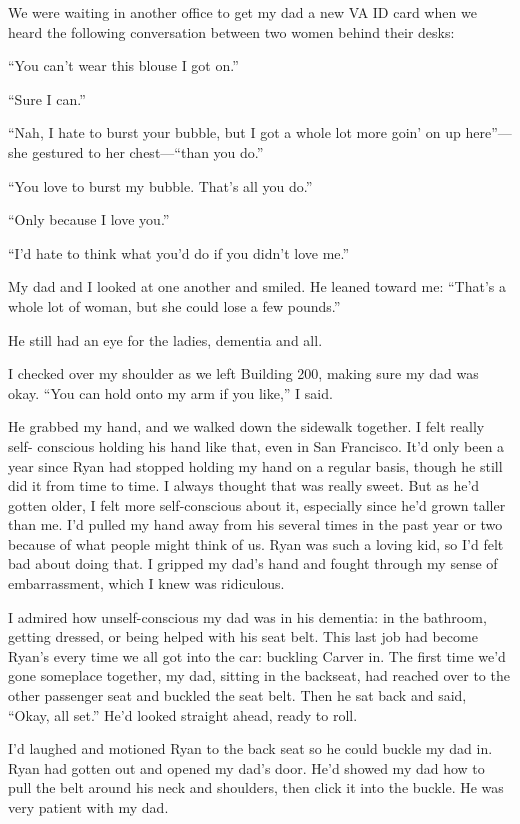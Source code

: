 \documentclass[12pt]{book}
\begin{document}
We were waiting in another office to get my dad a new VA ID card when we heard the following conversation between two women behind their desks:

``You can't wear this blouse I got on.'' 

``Sure I can.''

``Nah, I hate to burst your bubble, but I got a whole lot more goin' on up here''---she gestured to her chest---``than you do.''

``You love to burst my bubble. That's all you do.''

``Only because I love you.''

``I'd hate to think what you'd do if you didn't love me.''

My dad and I looked at one another and smiled. He leaned toward me: ``That's a whole lot of woman, but she could lose a few pounds.''

He still had an eye for the ladies, dementia and all.

I checked over my shoulder as we left Building 200, making sure my dad was okay. ``You can hold onto my arm if you like,'' I said.

He grabbed my hand, and we walked down the sidewalk together. I felt really self- conscious holding his hand like that, even in San Francisco. It'd only been a year since Ryan had stopped holding my hand on a regular basis, though he still did it from time to time. I always thought that was really sweet. But as he'd gotten older, I felt more self-conscious about it, especially since he'd grown taller than me. I'd pulled my hand away from his several times in the past year or two because of what people might think of us. Ryan was such a loving kid, so I'd felt bad about doing that. I gripped my dad's hand and fought through my sense of embarrassment, which I knew was ridiculous.

I admired how unself-conscious my dad was in his dementia: in the bathroom, getting dressed, or being helped with his seat belt. This last job had become Ryan's every time we all got into the car: buckling Carver in. The first time we'd gone someplace together, my dad, sitting in the backseat, had reached over to the other passenger seat and buckled the seat belt. Then he sat back and said, ``Okay, all set.'' He'd looked straight ahead, ready to roll.

I'd laughed and motioned Ryan to the back seat so he could buckle my dad in. Ryan had gotten out and opened my dad's door. He'd showed my dad how to pull the belt around his neck and shoulders, then click it into the buckle. He was very patient with my dad.
\end{document}
